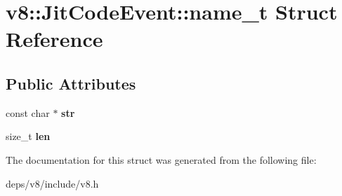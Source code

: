 \hypertarget{structv8_1_1_jit_code_event_1_1name__t}{}\section{v8\+:\+:Jit\+Code\+Event\+:\+:name\+\_\+t Struct Reference}
\label{structv8_1_1_jit_code_event_1_1name__t}
\subsection*{Public Attributes}
\begin{DoxyCompactItemize}
\item 
\hypertarget{structv8_1_1_jit_code_event_1_1name__t_a344732b4289a6a1fd21bb577ac9eff15}{}const char $\ast$ {\bfseries str}\label{structv8_1_1_jit_code_event_1_1name__t_a344732b4289a6a1fd21bb577ac9eff15}

\item 
\hypertarget{structv8_1_1_jit_code_event_1_1name__t_aa85ddd240f3b08c995caa8267ee8c586}{}size\+\_\+t {\bfseries len}\label{structv8_1_1_jit_code_event_1_1name__t_aa85ddd240f3b08c995caa8267ee8c586}

\end{DoxyCompactItemize}


The documentation for this struct was generated from the following file\+:\begin{DoxyCompactItemize}
\item 
deps/v8/include/v8.\+h\end{DoxyCompactItemize}
